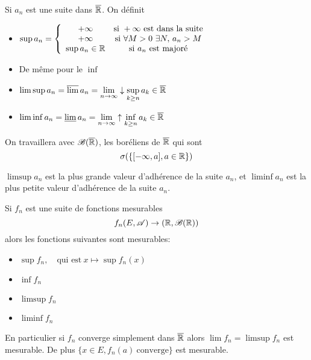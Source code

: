 \begin{definition}
	Si $a_n$ est une suite dans $\overline{\mathbb{R}}$. On définit
	\begin{itemize}
		\item $\sup a_n =
			      \left\{ \begin{array}{cc}
				      +\infty         & \text{si} \ +\infty \ \text{est dans la suite}   \\
				      +\infty         & \text{si} \ \forall M > 0 \ \exists N,\, a_n > M \\
				      \sup a_n \in \R & \text{si} \ a_n\  \text{est majoré}
			      \end{array}\right.$

		\item De même pour le $\inf$
		\item $\limsup a_n = \varlimsup a_n = \lim\limits_{n \to \infty}\downarrow \sup\limits_{k \geq n } a_k \in \overline{\mathbb{R}}$
		\item $\liminf a_n = \varliminf a_n = \lim\limits_{n \to \infty}\uparrow \inf\limits_{k \geq n } a_k \in \overline{\mathbb{R}}$
	\end{itemize}
\end{definition}


\begin{remarque}
	On travaillera avec $\mathscr{B}(\overline{\mathbb{R}})$, les boréliens de $\overline{\mathbb{R}}$ qui sont
	$$\sigma (\left\{[-\infty, a], a \in \mathbb{R}\right\})$$
\end{remarque}


\begin{remarque}
	$\limsup a_n$ est la plus grande valeur d'adhérence de la suite $a_n$, et
	$\liminf a_n$ est la plus petite valeur d'adhérence de la suite $a_n$.
\end{remarque}

\begin{prop}
	Si $f_n$ est une suite de fonctions mesurables
	$$f_n (E,\mathscr{A}) \rightarrow (\mathbb{R},\mathscr{B}(\mathbb{R}))$$
	alors les fonctions suivantes sont mesurables:
	\begin{itemize}
		\item $\sup f_n, \quad \text{qui est} \ x\mapsto \sup f_n(x) $
		\item $\inf f_n$
		\item $\limsup f_n$
		\item $\liminf f_n$
	\end{itemize}
	En particulier si $f_n$ converge simplement dans $\overline{\mathbb{R}}$ alors
	$\lim f_n = \limsup f_n$ est mesurable. De plus $\{ x \in E, f_n(a) \ \text{converge}\}$ est mesurable.
\end{prop}

